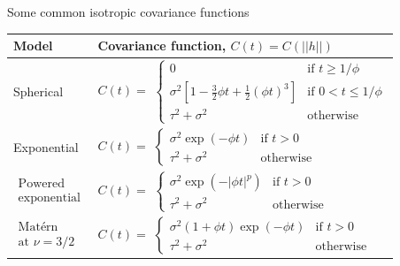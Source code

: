 \documentclass[xcolor=pdftex,dvipsnames,table,numbers,hyperref={pdfpagelabels=false},compress]{beamer}
\newcommand{\blue}[1]{{\color{RoyalBlue!90} #1}}
\newcommand{\green}[1]{{\color{Green} #1}}
\begin{document}
%
%
%
%
%
\begin{frame}{Some common isotropic covariance functions}
	\vspace{-0.25in}
	\begin{table}[t]
		\begin{center}
			\begin{tabular}{|ll|}\hline
				Model & Covariance function, $C(t)=C(||h||)$ \\\hline %
				Spherical & $C(t) = $ $\left \{ \begin{array}{cl}
				0 & \mbox{if } t\geq1/\phi\\
				\sigma^{2}\left[  1-\frac{3}{2}\phi t+\frac{1}{2}(\phi
				t)^{3}\right] &
				\mbox{if } 0<t\leq1/\phi\\
				\tau^{2}+\sigma^{2} &  \mbox{otherwise}
				\end{array} \right .$\\
				Exponential & $C(t) = $
				$\left \{ \begin{array}{cl}%
				\sigma^{2}\exp(-\phi t) & \mbox{if } t>0\\
				\tau^{2}+\sigma^{2} & \mbox{otherwise}\end{array} \right .$\\
				$\begin{array}{l}
				\!\!\! \mbox{Powered} \\
				\! \mbox{exponential}
				\end{array}$
				& $C(t) = $
				$\left \{ \begin{array}{cl}%
				\sigma^{2}\exp(-|\phi t|^{p}) & \mbox{if } t>0\\
				\tau^{2}+\sigma^{2} & \mbox{otherwise}
				\end{array} \right .$
				\\
				$\begin{array}{l}
				\!\!\! \mbox{Mat\'{e}rn}\\
				\! \mbox{at } \nu=3/2
				\end{array}$
				& $C(t) = $ $\left \{ \begin{array}{cl} \sigma^{2}\left(1+\phi
				t\right)  \exp({-\phi t}) &
				\mbox{if } t>0\\
				\tau^2 + \sigma^{2} &  \mbox{otherwise}
				\end{array} \right .$
				\\\hline
			\end{tabular}
			

\end{center}
\end{table}
\end{frame}
\end{document}
